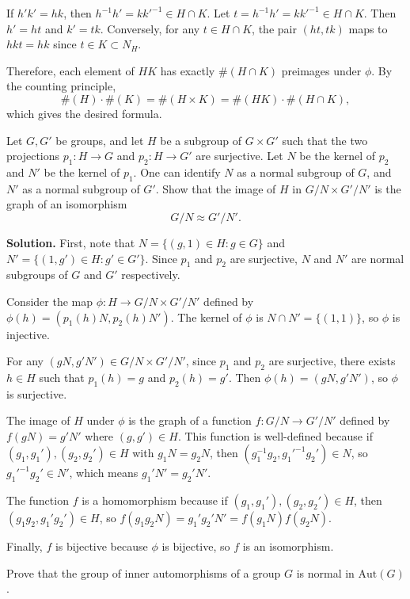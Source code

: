 If $h'k' = hk$, then $h^{-1}h' = kk'^{-1} \in H \cap K$. Let $t = h^{-1}h' = kk'^{-1} \in H \cap K$. Then $h' = ht$ and $k' = tk$. Conversely, for any $t \in H \cap K$, the pair $(ht, tk)$ maps to $hkt = hk$ since $t \in K \subset N_H$.

Therefore, each element of $HK$ has exactly $\#(H \cap K)$ preimages under $\phi$. By the counting principle,
\[\#(H) \cdot \#(K) = \#(H \times K) = \#(HK) \cdot \#(H \cap K),\]
which gives the desired formula.

\begin{problembox}
Let $G, G'$ be groups, and let $H$ be a subgroup of $G \times G'$ such that the two projections $p_1 : H \rightarrow G$ and $p_2 : H \rightarrow G'$ are surjective. Let $N$ be the kernel of $p_2$ and $N'$ be the kernel of $p_1$. One can identify $N$ as a normal subgroup of $G$, and $N'$ as a normal subgroup of $G'$. Show that the image of $H$ in $G/N \times G'/N'$ is the graph of an isomorphism
\[G/N \approx G'/N'.\]
\end{problembox}

\noindent\textbf{Solution.} First, note that $N = \{(g,1) \in H : g \in G\}$ and $N' = \{(1,g') \in H : g' \in G'\}$. Since $p_1$ and $p_2$ are surjective, $N$ and $N'$ are normal subgroups of $G$ and $G'$ respectively.

Consider the map $\phi: H \to G/N \times G'/N'$ defined by $\phi(h) = (p_1(h)N, p_2(h)N')$. The kernel of $\phi$ is $N \cap N' = \{(1,1)\}$, so $\phi$ is injective.

For any $(gN, g'N') \in G/N \times G'/N'$, since $p_1$ and $p_2$ are surjective, there exists $h \in H$ such that $p_1(h) = g$ and $p_2(h) = g'$. Then $\phi(h) = (gN, g'N')$, so $\phi$ is surjective.

The image of $H$ under $\phi$ is the graph of a function $f: G/N \to G'/N'$ defined by $f(gN) = g'N'$ where $(g,g') \in H$. This function is well-defined because if $(g_1,g_1'), (g_2,g_2') \in H$ with $g_1N = g_2N$, then $(g_1^{-1}g_2, g_1'^{-1}g_2') \in N$, so $g_1'^{-1}g_2' \in N'$, which means $g_1'N' = g_2'N'$.

The function $f$ is a homomorphism because if $(g_1,g_1'), (g_2,g_2') \in H$, then $(g_1g_2, g_1'g_2') \in H$, so $f(g_1g_2N) = g_1'g_2'N' = f(g_1N)f(g_2N)$.

Finally, $f$ is bijective because $\phi$ is bijective, so $f$ is an isomorphism.

\begin{problembox}
Prove that the group of inner automorphisms of a group $G$ is normal in $\text{Aut}(G)$.
\end{problembox}

